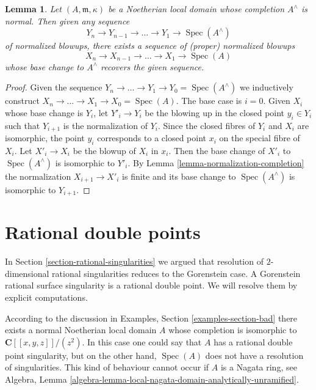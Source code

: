 \documentclass{stacks-project}
\theoremstyle{plain}
\newtheorem{lemma}[subsection]{Lemma}
\theoremstyle{definition}
\theoremstyle{remark}
\numberwithin{equation}{subsection}
\def\Spec{\mathop{\mathrm{Spec}}}
\begin{document}
\begin{lemma}
\label{lemma-normalized-blowup-completion}
Let $(A, \mathfrak m, \kappa)$ be a Noetherian local domain whose completion
$A^\wedge$ is normal. Then given any sequence
$$
Y_n \to Y_{n - 1} \to \ldots \to Y_1 \to \Spec(A^\wedge)
$$
of normalized blowups, there exists a sequence of (proper) normalized blowups
$$
X_n \to X_{n - 1} \to \ldots \to X_1 \to \Spec(A)
$$
whose base change to $A^\wedge$ recovers the given sequence.
\end{lemma}

\begin{proof}
Given the sequence $Y_n \to \ldots \to Y_1 \to Y_0 = \Spec(A^\wedge)$ we
inductively construct $X_n \to \ldots \to X_1 \to X_0 = \Spec(A)$.
The base case is $i = 0$. Given $X_i$ whose base change is $Y_i$,
let $Y'_i \to Y_i$ be the blowing up in the closed point $y_i \in Y_i$
such that $Y_{i + 1}$ is the normalization of $Y_i$.
Since the closed fibres of $Y_i$ and $X_i$ are isomorphic, the point
$y_i$ corresponds to a closed point $x_i$ on the special fibre of $X_i$.
Let $X'_i \to X_i$ be the blowup of $X_i$ in $x_i$. Then the base change
of $X'_i$ to $\Spec(A^\wedge)$ is isomorphic to $Y'_i$. 
By Lemma \ref{lemma-normalization-completion}
the normalization $X_{i + 1} \to X'_i$ is finite and its base change
to $\Spec(A^\wedge)$ is isomorphic to $Y_{i + 1}$.
\end{proof}














\section{Rational double points}
\label{section-rational-double-points}

\noindent
In Section \ref{section-rational-singularities}
we argued that resolution of $2$-dimensional
rational singularities reduces to the Gorenstein case.
A Gorenstein rational surface singularity is a rational double point.
We will resolve them by explicit computations.

\medskip\noindent
According to the discussion in Examples, Section \ref{examples-section-bad}
there exists a normal Noetherian local domain $A$ whose completion
is isomorphic to $\mathbf{C}[[x, y, z]]/(z^2)$. In this case one could
say that $A$ has a rational double point singularity, but on the other
hand, $\Spec(A)$ does not have a resolution of singularities.
This kind of behaviour cannot occur if $A$ is a Nagata ring, see
Algebra, Lemma \ref{algebra-lemma-local-nagata-domain-analytically-unramified}.
\end{document}
